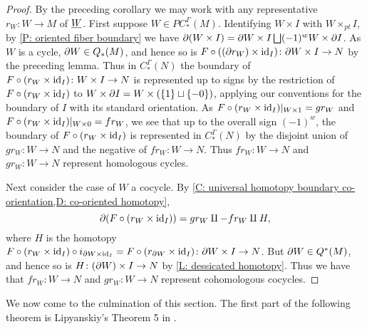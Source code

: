 \begin{proof}
	By the preceding corollary we may work with any representative $r_W \colon W \to M$ of $\underline{W}$.
	First suppose $W \in PC_*^\Gamma(M)$.
	Identifying $W \times I$ with $W \times_{pt} I$, by \cref{P: oriented fiber boundary} we have $\partial (W \times I) = \partial W \times I \bigsqcup (-1)^{w} W \times \partial I$.
	As $W$ is a cycle, $\partial W \in Q_*(M)$, and hence so is $F \circ ((\partial r_W) \times \mathrm{id}_I) \colon \partial W \times I \to N$ by the preceding lemma.
	Thus in $C^\Gamma_*(N)$ the boundary of $F \circ (r_W \times \mathrm{id}_I) \colon W \times I \to N$ is represented up to signs by the restriction of
	$F \circ (r_W \times \mathrm{id}_I)$ to $W \times \partial I = W \times (\{1\} \sqcup \{-0\})$, applying our conventions for the boundary of $I$ with its standard orientation.
	As $F \circ (r_W \times \mathrm{id}_I)|_{W \times 1} = gr_W$ and $F \circ (r_W \times \mathrm{id}_I)|_{W \times 0} = fr_W$, we see that up to the overall sign $(-1)^{w}$, the boundary of $F \circ (r_W \times \mathrm{id}_I)$ is represented in $C_*^\Gamma(N)$ by the disjoint union of $gr_W \colon W \to N$ and the negative of $fr_W \colon W \to N$.
	Thus $fr_W \colon W \to N$ and $gr_W \colon W \to N$ represent homologous cycles.

	Next consider the case of $W$ a cocycle. By \cref{C: universal homotopy boundary co-orientation,D: co-oriented homotopy}, $$\partial (F \circ (r_W \times \mathrm{id}_I)) = gr_W \amalg -fr_W \amalg H,$$ where $H$ is the homotopy $F \circ (r_W \times \mathrm{id}_I) \circ i_{\partial W \times \mathrm{id}_I} = F \circ (r_{\partial W} \times \mathrm{id}_I) \colon \partial W \times I \to N$.
	But $\partial W \in Q^*(M)$, and hence so is $H \colon (\partial W) \times I \to N$ by \cref{L: dessicated homotopy}.
	Thus we have
	that $fr_W \colon W \to N$ and $gr_W \colon W \to N$ represent cohomologous cocycles.
\end{proof}

We now come to the culmination of this section.
The first part of the following theorem is Lipyanskiy's Theorem 5 in \cite{Lipy14}.

